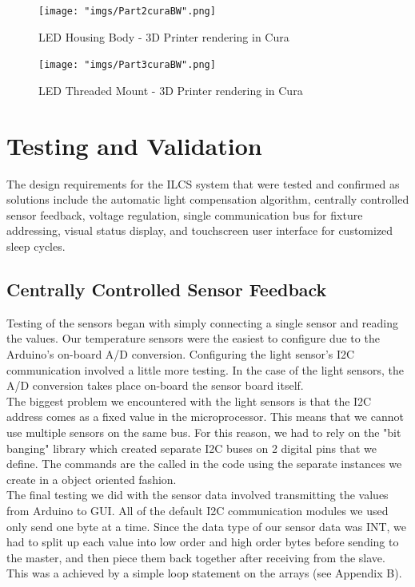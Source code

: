 \documentclass[12pt,a4paper]{report}
\begin{document}
\begin{figure}[H]
	\centering
	\texttt{[image: "imgs/Part2curaBW".png]}\par			\vspace{0.1cm}
	\caption{LED Housing Body - 3D Printer rendering in Cura}
\end{figure}

\begin{figure}[H]
	\centering
	\texttt{[image: "imgs/Part3curaBW".png]}\par			\vspace{0.1cm}
	\caption{LED Threaded Mount - 3D Printer rendering in Cura}
\end{figure}

\section{Testing and Validation}
The design requirements for the ILCS system that were tested and confirmed as solutions include the automatic light compensation algorithm, centrally controlled sensor feedback, voltage regulation, single communication bus for fixture addressing, visual status display, and touchscreen user interface for customized sleep cycles. \\



\subsection{Centrally Controlled Sensor Feedback}
Testing of the sensors began with simply connecting a single sensor and reading the values. Our temperature sensors were the easiest to configure due to the Arduino's on-board A/D conversion. Configuring the light sensor's I2C communication involved a little more testing. In the case of the light sensors, the A/D conversion takes place on-board the sensor board itself. \\
The biggest problem we encountered with the light sensors is that the I2C address comes as a fixed value in the microprocessor. This means that we cannot use multiple sensors on the same bus. For this reason, we had to rely on the "bit banging" library which created separate I2C buses on 2 digital pins that we define. The commands are the called in the code using the separate instances we create in a object oriented fashion.\\
The final testing we did with the sensor data involved transmitting the values from Arduino to GUI. All of the default I2C communication modules we used only send one byte at a time. Since the data type of our sensor data was INT, we had to split up each value into low order and high order bytes before sending to the master, and then piece them back together after receiving from the slave. This was a achieved by a simple loop statement on the arrays (see Appendix B).
\end{document}
